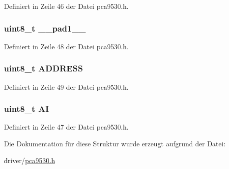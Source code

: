 Definiert in Zeile 46 der Datei pca9530.\+h.

\hypertarget{structpca9530__ctl_a77f12d2e278bd5c07712648ac0df5e08}{}
\subsubsection[{\+\_\+\+\_\+pad1\+\_\+\+\_\+}]{\setlength{\rightskip}{0pt plus 5cm}uint8\+\_\+t \+\_\+\+\_\+pad1\+\_\+\+\_\+}\label{structpca9530__ctl_a77f12d2e278bd5c07712648ac0df5e08}


Definiert in Zeile 48 der Datei pca9530.\+h.

\hypertarget{structpca9530__ctl_af3bea2c4759f3d001950aba2a1f89810}{}
\subsubsection[{A\+D\+D\+R\+E\+S\+S}]{\setlength{\rightskip}{0pt plus 5cm}uint8\+\_\+t A\+D\+D\+R\+E\+S\+S}\label{structpca9530__ctl_af3bea2c4759f3d001950aba2a1f89810}


Definiert in Zeile 49 der Datei pca9530.\+h.

\hypertarget{structpca9530__ctl_a8782eaf4d6ff8b39d2ef058050c8a0e3}{}
\subsubsection[{A\+I}]{\setlength{\rightskip}{0pt plus 5cm}uint8\+\_\+t A\+I}\label{structpca9530__ctl_a8782eaf4d6ff8b39d2ef058050c8a0e3}


Definiert in Zeile 47 der Datei pca9530.\+h.



Die Dokumentation für diese Struktur wurde erzeugt aufgrund der Datei\+:\begin{DoxyCompactItemize}
\item 
driver/\hyperlink{pca9530_8h}{pca9530.\+h}\end{DoxyCompactItemize}
